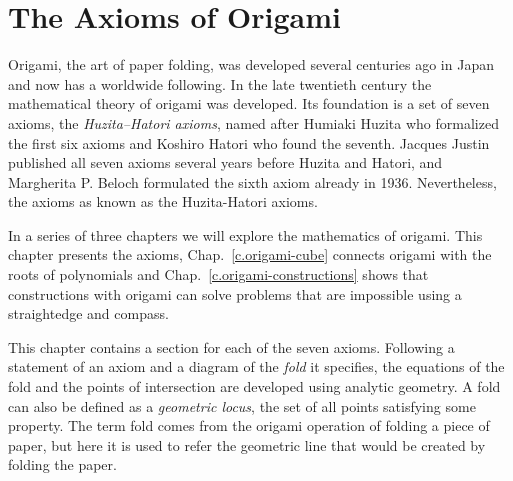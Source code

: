 

\chapter{The Axioms of Origami}\label{c.origami-axioms}




Origami, the art of paper folding, was developed several centuries ago in Japan and now has a worldwide following. In the late twentieth century the mathematical theory of origami was developed. Its foundation is a set of seven axioms, the 
\emph{Huzita–Hatori axioms}, named after Humiaki Huzita who formalized the first six axioms and Koshiro Hatori who found the seventh. Jacques Justin published all seven axioms several years before Huzita and Hatori, and Margherita P. Beloch formulated the sixth axiom already in 1936. Nevertheless, the axioms as known as the Huzita-Hatori axioms.

In a series of three chapters we will explore the mathematics of origami. This chapter presents the axioms, Chap.~\ref{c.origami-cube} connects origami with the roots of polynomials and Chap.~\ref{c.origami-constructions} shows that constructions with origami can solve problems that are impossible using a straightedge and compass.
 
This chapter contains a section for each of the seven axioms. Following a statement of an axiom and a diagram of the \emph{fold} it specifies, the equations of the fold and the points of intersection are developed using analytic geometry. A fold can also be defined as a \emph{geometric locus}, the set of all points satisfying some property. The term fold comes from the origami operation of folding a piece of paper, but here it is used to refer the geometric line that would be created by folding the paper.

